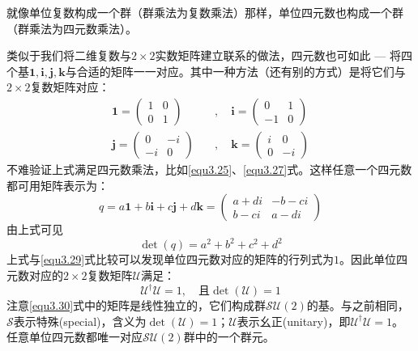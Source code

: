 就像单位复数构成一个群（群乘法为复数乘法）那样，单位四元数也构成一个群（群乘法为四元数乘法）。

类似于我们将二维复数与$2 \times 2$实数矩阵建立联系的做法，四元数也可如此 --- 将四个基$\mathbf{1,i,j,k}$与合适的矩阵一一对应。其中一种方法（还有别的方式）是将它们与$2 \times 2$复数矩阵对应：
\begin{align}
\mathbf{1} = \begin{pmatrix}
				1 & 0 \\ 0 & 1
			 \end{pmatrix}
\quad &, \quad
\mathbf{i} = \begin{pmatrix}
				0 & 1 \\ -1 & 0 
			 \end{pmatrix}
\nonumber \\
\label{equ3.30}
\mathbf{j} = \begin{pmatrix}
				0 & -i \\ -i & 0
			 \end{pmatrix}
\quad &, \quad
\mathbf{k} = \begin{pmatrix}
				i & 0 \\
				0 & -i
			 \end{pmatrix}
\end{align}
不难验证上式满足四元数乘法，比如\ref{equ3.25}、\ref{equ3.27}式。这样任意一个四元数都可用矩阵表示为：
\begin{equation}
\label{equ3.31}
q = a\mathbf{1} + b\mathbf{i} + c\mathbf{j} + d\mathbf{k} = \begin{pmatrix}
	a + di & -b - ci \\
	b - ci & a - di
	\end{pmatrix}
\end{equation}
由上式可见
\begin{equation}
\label{equ3.32}
\det(q) = a^2 + b^2 + c^2 + d^2
\end{equation}
上式与\ref{equ3.29}式比较可以发现单位四元数对应的矩阵的行列式为$1$。因此单位四元数对应的$2 \times 2$复数矩阵$\mathcal{U}$满足：
\begin{equation}
\label{equ3.33}
\mathcal{U}^\dag \mathcal{U} = 1, \quad \text{且} \det(\mathcal{U}) = 1
\end{equation}
注意\ref{equ3.30}式中的矩阵是线性独立的，它们构成群$\mathcal{SU}(2)$的基。与之前相同，$\mathcal{S}$表示特殊(special)，含义为$\det (\mathcal{U}) = 1$；$\mathcal{U}$表示幺正(unitary)，即$\mathcal{U}^\dag \mathcal{U} = 1$。任意单位四元数都唯一对应$\mathcal{SU}(2)$群中的一个群元。

